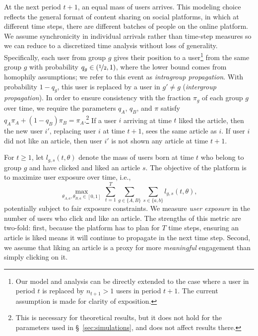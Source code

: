 \documentclass[letterpaper]{article} %
\begin{document}
At the next period $t+1$, an equal mass of users arrives.
%
This modeling choice reflects the general format of content sharing on social platforms, in which at different time steps, there are different batches of people on the online platform. 
%
We assume synchronicity in individual arrivals rather than time-step measures so we can reduce to a discretized time analysis without loss of generality.
%
Specifically, each user from group $g$ gives their position to a user\footnote{Our model and analysis can be directly extended to the case where a user in period $t$ is replaced by $n_{t+1}>1$ users in period $t+1$. The current assumption is made for clarity of exposition.} from the same group $g$ with probability $q_g\in (\nicefrac{1}{2},1)$, where the lower bound comes from homophily assumptions; we refer to this event as \emph{intragroup propagation}.
%
With probability $1-q_g$, this user is replaced by a user in $g' \neq g$ (\emph{intergroup propagation}).
%
In order to ensure consistency with the fraction $\pi_g$ of each group $g$ over time, we require the parameters $q_A$, $q_B$, and $\pi$  satisfy $ q_A \pi_A + (1-q_B) \pi_B = \pi_A.$\footnote{This is necessary for theoretical results, but it does not hold for the parameters used in \S~\ref{sec:simulations}, and does not affect results there.}
%
If a user $i$ arriving at time $t$ liked the article, then the new user $i'$, replacing  user $i$ at time $t+1$, sees the same article as $i$.
%
If user $i$ did not like an article, then user $i'$ is not shown any article at time $t+1$.

For $t\geq 1$, let $l_{g,s}(t,\theta)$ denote the mass of users born at time $t$ who belong to group $g$ and have clicked and liked an article $s$.
%
The objective of the platform is to maximize user exposure  over time, i.e.,
\footnotesize
\begin{equation}
     \max_{\theta_{A,a}, \theta_{B,a} \in [0,1]} \, \sum_{t = 1}^T \sum_{g\in \{A,B\}}\sum_{s\in \{a,b\}} l_{g,s}(t,\theta), \label{eq:platform-optimization-problem-general}
\end{equation}
\normalsize
potentially subject to  fair exposure constraints.
%
We measure \emph{user exposure} in the number of users who click and like an article.
%
The strengths of this metric are two-fold: first, because the platform has to plan for $T$ time steps, ensuring an article is liked means it will continue to propagate in the next time step.
%
Second, we assume that liking an article is a proxy for more \emph{meaningful} engagement than simply clicking on it.
\end{document}
